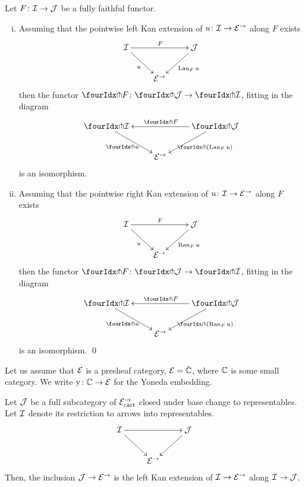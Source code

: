 \documentclass[reqno,10pt,a4paper,oneside]{amsart}
\begin{document}
\begin{proposition} Let $F \co \cal{I} \to \cal{J}$ be a fully faithful functor. 
\label{kan-extension-closure}
\begin{enumerate}[(i)]
\item Assuming that the pointwise left Kan extension of 
$u \co \cal{I} \to \catE^{\to}$ along $F$ exists
\[
\xymatrix{
  \cal{I}
  \ar[dr]_{u}
  \ar[rr]^{F}
&&
  \cal{J}
  \ar[dl]^{\Lan_F u}
\\&
  \catE^{\to}
}
\]
then the functor $\liftr{F} \co \liftr{\cal{J}} \to \liftr{\cal{I}}$,  fitting in the diagram
\[
\xymatrix{
  \liftr{\cal{I}}
  \ar[dr]_{\liftr{u}}
&&
  \liftr{\cal{J}}
  \ar[ll]_{\liftr{F}}
  \ar[dl]^{\liftr{(\Lan_F u)}}
\\&
  \catE^{\to}
}
\]
is an isomorphism.
\item Assuming that the pointwise right Kan extension of 
$u \co \cal{I} \to \catE^{\to}$ along $F$ exists
\[
\xymatrix{
  \cal{I}
  \ar[dr]_{u}
  \ar[rr]^{F}
&&
  \cal{J}
  \ar[dl]^{\Ran_F u}
\\&
  \catE^{\to}
}
\]
then the functor $\liftl{F} \co \liftl{\cal{J}} \to \liftl{\cal{I}}$, fitting in the diagram
\[
\xymatrix{
  \liftl{\cal{I}}
  \ar[dr]_{\liftl{u}}
&&
  \liftl{\cal{J}}
  \ar[ll]_{\liftl{F}}
  \ar[dl]^{\liftl{(\Ran_F u)}}
\\&
  \catE^{\to}
}
\]
is an isomorphism. \qed
\end{enumerate}
\end{proposition}









\medskip

\newcommand{\yon}{\mathrm{y}} 
Let us assume that $\catE$ is a presheaf category, \ie $\catE = \hat{\cat{C}}$, where $\catC$ is some small category. We write $\yon \co \cat{C} \to \catE$ for the Yoneda embedding.

\begin{lemma}
\label{left-kan-extension-of-representables}
Let $\cal{J}$ be a full subcategory of $\catE_{\cart}^{\to}$ closed under base change to representables.
Let $\cal{I}$ denote its restriction to arrows into representables.
\[
\xymatrix{
  \cal{I}
  \ar[rr]
  \ar[dr]
&&
  \cal{J}
  \ar[dl]
\\&
  \catE^{\to}
}
\]
Then, the inclusion $\cal{J} \to \catE^{\to}$ is the left Kan extension of $\cal{I} \to \catE^{\to}$ along $\cal{I} \to \cal{J}$.
\end{lemma}
\end{document}
